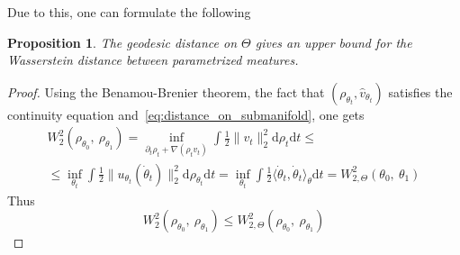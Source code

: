 \documentclass{article} %
\newtheorem{proposition}{Proposition}[section]
\numberwithin{equation}{subsection}
\numberwithin{theorem}{section}
\newcommand{\dd}{\mathrm{d}}
\newcommand{\PWspace}{\mathcal{P}_\Theta}
\newtheorem{remark}{Remark}[section]
\begin{document}
    Due to this, one can formulate the following
    \begin{proposition}
        The geodesic distance on $\Theta$ gives an upper bound for the Wasserstein distance between parametrized meatures.
    \end{proposition}
    \begin{proof}
    Using the Benamou-Brenier theorem, the fact that $(\rho_{\theta_t}, \hat{v}_{\theta_t})$ satisfies the continuity equation and~\eqref{eq:distance_on_submanifold}, one gets
    \begin{multline*}
        W^2_2(\rho_{\theta_0},\ \rho_{\theta_1}) = 
            \inf\limits_{\partial_t \rho_t + \nabla(\rho_t v_t)} \int \frac{1}{2} \|v_t\|^2_2 \dd\rho_t \dd t\leq \\ \leq
            \inf\limits_{\theta_t} \int \frac{1}{2} \|{u}_{\theta_t}(\dot\theta_t)\|^2_2 \dd\rho_{\theta_t}\dd t = 
            \inf\limits_{\theta_t} \int \frac{1}{2} \langle \dot\theta_t, \dot\theta_t \rangle_{\theta} \dd t =  W^2_{2,\Theta}(\theta_0,\ \theta_1) 
    \end{multline*}
    Thus
    \begin{equation}
        W^2_2(\rho_{\theta_0},\ \rho_{\theta_1}) \leq W^2_{2,\Theta}(\rho_{\theta_0},\ \rho_{\theta_1})
    \end{equation}
    \end{proof}
\end{document}
